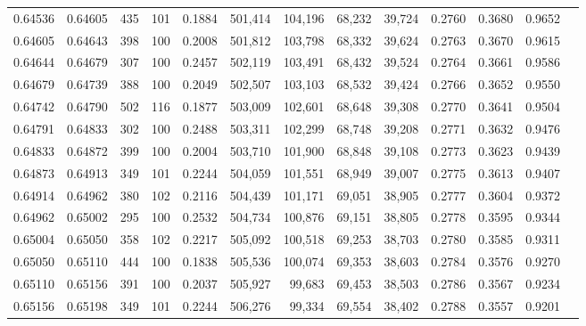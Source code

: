 \begin{tabular}{rrrrrrrrrrrrr}
0.64536 & 0.64605 &   435 & 101 &                                     0.1884 & 501,414 & 104,196 &  68,232 &  39,724 & 0.2760 & 0.3680 & 0.9652 \\
0.64605 & 0.64643 &   398 & 100 &                                     0.2008 & 501,812 & 103,798 &  68,332 &  39,624 & 0.2763 & 0.3670 & 0.9615 \\
0.64644 & 0.64679 &   307 & 100 &                                     0.2457 & 502,119 & 103,491 &  68,432 &  39,524 & 0.2764 & 0.3661 & 0.9586 \\
0.64679 & 0.64739 &   388 & 100 &                                     0.2049 & 502,507 & 103,103 &  68,532 &  39,424 & 0.2766 & 0.3652 & 0.9550 \\
0.64742 & 0.64790 &   502 & 116 &                                     0.1877 & 503,009 & 102,601 &  68,648 &  39,308 & 0.2770 & 0.3641 & 0.9504 \\
0.64791 & 0.64833 &   302 & 100 &                                     0.2488 & 503,311 & 102,299 &  68,748 &  39,208 & 0.2771 & 0.3632 & 0.9476 \\
0.64833 & 0.64872 &   399 & 100 &                                     0.2004 & 503,710 & 101,900 &  68,848 &  39,108 & 0.2773 & 0.3623 & 0.9439 \\
0.64873 & 0.64913 &   349 & 101 &                                     0.2244 & 504,059 & 101,551 &  68,949 &  39,007 & 0.2775 & 0.3613 & 0.9407 \\
0.64914 & 0.64962 &   380 & 102 &                                     0.2116 & 504,439 & 101,171 &  69,051 &  38,905 & 0.2777 & 0.3604 & 0.9372 \\
0.64962 & 0.65002 &   295 & 100 &                                     0.2532 & 504,734 & 100,876 &  69,151 &  38,805 & 0.2778 & 0.3595 & 0.9344 \\
0.65004 & 0.65050 &   358 & 102 &                                     0.2217 & 505,092 & 100,518 &  69,253 &  38,703 & 0.2780 & 0.3585 & 0.9311 \\
0.65050 & 0.65110 &   444 & 100 &                                     0.1838 & 505,536 & 100,074 &  69,353 &  38,603 & 0.2784 & 0.3576 & 0.9270 \\
0.65110 & 0.65156 &   391 & 100 &                                     0.2037 & 505,927 &  99,683 &  69,453 &  38,503 & 0.2786 & 0.3567 & 0.9234 \\
0.65156 & 0.65198 &   349 & 101 &                                     0.2244 & 506,276 &  99,334 &  69,554 &  38,402 & 0.2788 & 0.3557 & 0.9201 \\

\end{tabular}
